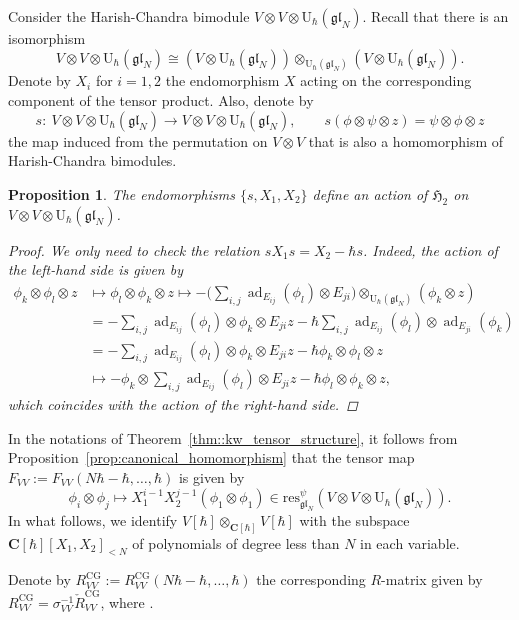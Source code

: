 \documentclass[10pt,a4paper]{article}
\numberwithin{equation}{section}
\newtheorem{Proposition}[Theorem]{Proposition}
{ \theoremstyle{definition}
	\newtheorem{Definition}[Theorem]{Definition}
	\newtheorem{Note}[Theorem]{Note}
	\newtheorem{Example}[Theorem]{Example}
	\newtheorem{Remark}[Theorem]{Remark} }
\newcommand{\CG}{\mathrm{CG}}
\newcommand{\C}{\mathbf{C}}
\newcommand{\U}{\mathrm{U}_{\hbar}}
\DeclareMathOperator{\ad}{ad}
\newcommand{\res}{\mathrm{res}}
\newcommand{\gl}{\mathfrak{gl}}
\begin{document}
	Consider the Harish-Chandra bimodule $V \otimes V \otimes \U(\gl_N)$. Recall that there is an isomorphism
	\[
	V \otimes V \otimes \U(\gl_N) \cong (V \otimes \U(\gl_N)) \otimes_{\U(\gl_N)} (V \otimes \U(\gl_N)).
	\]
	Denote by $X_i$ for $i=1,2$ the endomorphism $X$ acting on the corresponding component of the tensor product. Also, denote by
	\[
	s \colon\ V \otimes V \otimes \U(\gl_N) \rightarrow V \otimes V \otimes \U(\gl_N), \qquad s(\phi \otimes \psi \otimes z) = \psi \otimes \phi \otimes z
	\]
	the map induced from the permutation on $V \otimes V$ that is also a homomorphism of Harish-Chandra bimodules.
	
	\begin{Proposition}
		The endomorphisms $\{s,X_1,X_2\}$ define an action of $\mathfrak{H}_2$ on $V \otimes V \otimes \U(\gl_N)$.
		\begin{proof}
			We only need to check the relation $s X_1 s = X_2 - \hbar s$. Indeed, the action of the left-hand side is given by
			\begin{align*}
				\phi_k \otimes \phi_l \otimes z &\mapsto \phi_l \otimes \phi_k \otimes z \mapsto -\bigg(\sum_{i,j} \ad_{E_{ij}}(\phi_l) \otimes E_{ji}\bigg) \otimes_{\U(\gl_N)} (\phi_k \otimes z) \\
				& = -\sum_{i,j} \ad_{E_{ij}}(\phi_l) \otimes \phi_k \otimes E_{ji}z - \hbar \sum_{i,j} \ad_{E_{ij}} (\phi_l) \otimes \ad_{E_{ji}} (\phi_k) \\
				&= -\sum_{i,j} \ad_{E_{ij}}(\phi_l) \otimes \phi_k \otimes E_{ji}z - \hbar \phi_k \otimes \phi_l \otimes z \\
				&\mapsto - \phi_k\otimes \sum_{i,j} \ad_{E_{ij}}(\phi_l) \otimes E_{ji}z - \hbar \phi_l \otimes \phi_k \otimes z,
			\end{align*}
			which coincides with the action of the right-hand side.
		\end{proof}
	\end{Proposition}
	
	In the notations of Theorem~\ref{thm::kw_tensor_structure}, it follows from Proposition~\ref{prop:canonical_homomorphism} that the tensor map $F_{VV}:=F_{VV}(N\hbar-\hbar,\dots,\hbar)$ is given by
	\[
	\phi_i \otimes \phi_j \mapsto X_1^{i-1} X_2^{j-1}(\phi_1 \otimes \phi_1)\in \res^{\psi}_{\gl_N}(V \otimes V \otimes \U(\gl_N)).
	\]
	In what follows, we identify $V[\hbar] \otimes_{\C[\hbar]} V[\hbar]$ with the subspace $\C[\hbar][X_1,X_2]_{<N}$ of polynomials of degree less than $N$ in each variable.
	
	Denote by $R^{\CG}_{VV}:= R^{\CG}_{VV}(N\hbar-\hbar,\dots,\hbar)$ the corresponding $R$-matrix given by $R^{\CG}_{VV}\! =\! \sigma_{VV}^{-1} \check{R}^{\CG}_{VV}$, where \smash{$\check{R}^{\CG}_{VV} = F_{VV}^{-1} \sigma_{VV} F_{VV}$}.
	
\end{document}
